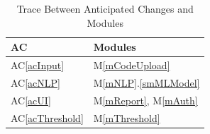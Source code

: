 \documentclass[12pt, titlepage]{article}
\newcommand{\acref}[1]{AC\ref{#1}}
\newcommand{\mref}[1]{M\ref{#1}}
\newcommand{\smref}[2]{M\ref{#1}.\ref{#2}}
\begin{document}
\begin{table}[H]
  \centering
  \begin{tabular}{p{} p{}}
  \toprule
  \textbf{AC} & \textbf{Modules}\\
  \midrule
  \acref{acInput} & \mref{mCodeUpload} \\
  \acref{acNLP} & \smref{mNLP}{smMLModel} \\
  \acref{acUI} & \mref{mReport}, \mref{mAuth} \\
  \acref{acThreshold} & \mref{mThreshold} \\
  \bottomrule
  \end{tabular}
  \caption{Trace Between Anticipated Changes and Modules}
  \label{TblACT}
\end{table}
\end{document}
